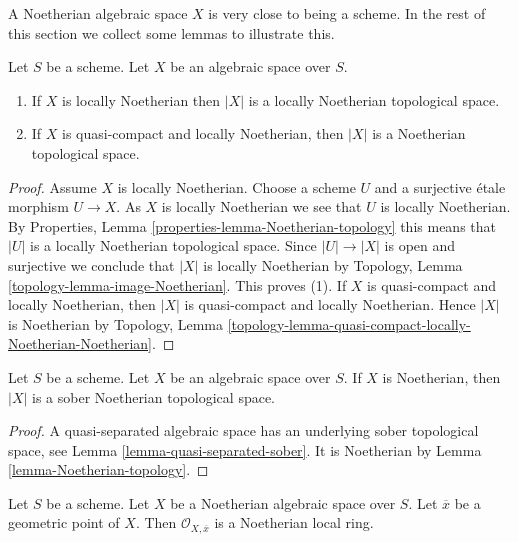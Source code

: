 \medskip\noindent
A Noetherian algebraic space $X$ is very close to being a scheme.
In the rest of this section we collect some lemmas to illustrate this.

\begin{lemma}
\label{lemma-Noetherian-topology}
Let $S$ be a scheme. Let $X$ be an algebraic space over $S$.
\begin{enumerate}
\item If $X$ is locally Noetherian then $|X|$ is a locally Noetherian
topological space.
\item If $X$ is quasi-compact and locally Noetherian, then $|X|$
is a Noetherian topological space.
\end{enumerate}
\end{lemma}

\begin{proof}
Assume $X$ is locally Noetherian.
Choose a scheme $U$ and a surjective \'etale morphism
$U \to X$. As $X$ is locally Noetherian we see that $U$ is locally
Noetherian. By
Properties, Lemma \ref{properties-lemma-Noetherian-topology}
this means that $|U|$ is a locally Noetherian topological space.
Since $|U| \to |X|$ is open and surjective we conclude that
$|X|$ is locally Noetherian by
Topology, Lemma \ref{topology-lemma-image-Noetherian}.
This proves (1). If $X$ is quasi-compact and locally Noetherian,
then $|X|$ is quasi-compact and locally Noetherian. Hence $|X|$
is Noetherian by
Topology,
Lemma \ref{topology-lemma-quasi-compact-locally-Noetherian-Noetherian}.
\end{proof}

\begin{lemma}
\label{lemma-Noetherian-sober}
Let $S$ be a scheme. Let $X$ be an algebraic space over $S$.
If $X$ is Noetherian, then $|X|$ is a sober Noetherian topological space.
\end{lemma}

\begin{proof}
A quasi-separated algebraic space has an underlying sober topological
space, see
Lemma \ref{lemma-quasi-separated-sober}.
It is Noetherian by
Lemma \ref{lemma-Noetherian-topology}.
\end{proof}

\begin{lemma}
\label{lemma-Noetherian-local-ring-Noetherian}
Let $S$ be a scheme. Let $X$ be a Noetherian algebraic space over $S$.
Let $\overline{x}$ be a geometric point of $X$. Then
$\mathcal{O}_{X, \overline{x}}$ is a Noetherian local ring.
\end{lemma}

